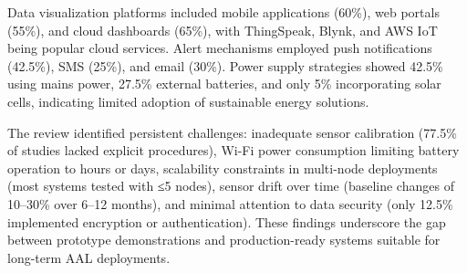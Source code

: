\documentclass[12pt]{report}
\begin{document}
Data visualization platforms included mobile applications (60\%), web portals (55\%), and cloud dashboards (65\%), with ThingSpeak, Blynk, and AWS IoT being popular cloud services. Alert mechanisms employed push notifications (42.5\%), SMS (25\%), and email (30\%). Power supply strategies showed 42.5\% using mains power, 27.5\% external batteries, and only 5\% incorporating solar cells, indicating limited adoption of sustainable energy solutions.

The review identified persistent challenges: inadequate sensor calibration (77.5\% of studies lacked explicit procedures), Wi-Fi power consumption limiting battery operation to hours or days, scalability constraints in multi-node deployments (most systems tested with ≤5 nodes), sensor drift over time (baseline changes of 10--30\% over 6--12 months), and minimal attention to data security (only 12.5\% implemented encryption or authentication). These findings underscore the gap between prototype demonstrations and production-ready systems suitable for long-term AAL deployments.
\end{document}
